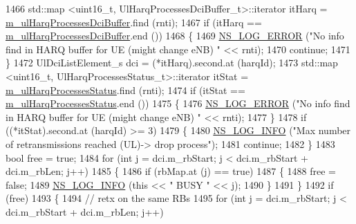 \begin{DoxyCode}
1466               std::map <uint16\_t, UlHarqProcessesDciBuffer\_t>::iterator itHarq = 
      \hyperlink{classns3_1_1TtaFfMacScheduler_a9ead4d91174d42d6995978358c08689e}{m\_ulHarqProcessesDciBuffer}.find (rnti);
1467               \textcolor{keywordflow}{if} (itHarq == \hyperlink{classns3_1_1TtaFfMacScheduler_a9ead4d91174d42d6995978358c08689e}{m\_ulHarqProcessesDciBuffer}.end ())
1468                 \{
1469                   \hyperlink{group__logging_ga0261a8db1d4ac5f79417d117634fd455}{NS\_LOG\_ERROR} (\textcolor{stringliteral}{"No info find in HARQ buffer for UE (might change eNB) "} << 
      rnti);
1470                   \textcolor{keywordflow}{continue};
1471                 \}
1472               UlDciListElement\_s dci = (*itHarq).second.at (harqId);
1473               std::map <uint16\_t, UlHarqProcessesStatus\_t>::iterator itStat = 
      \hyperlink{classns3_1_1TtaFfMacScheduler_a2c0bc82abe6c71b7e4d85b4caca2aaa6}{m\_ulHarqProcessesStatus}.find (rnti);
1474               \textcolor{keywordflow}{if} (itStat == \hyperlink{classns3_1_1TtaFfMacScheduler_a2c0bc82abe6c71b7e4d85b4caca2aaa6}{m\_ulHarqProcessesStatus}.end ())
1475                 \{
1476                   \hyperlink{group__logging_ga0261a8db1d4ac5f79417d117634fd455}{NS\_LOG\_ERROR} (\textcolor{stringliteral}{"No info find in HARQ buffer for UE (might change eNB) "} << 
      rnti);
1477                 \}
1478               \textcolor{keywordflow}{if} ((*itStat).second.at (harqId) >= 3)
1479                 \{
1480                   \hyperlink{group__logging_gafbd73ee2cf9f26b319f49086d8e860fb}{NS\_LOG\_INFO} (\textcolor{stringliteral}{"Max number of retransmissions reached (UL)-> drop process"});
1481                   \textcolor{keywordflow}{continue};
1482                 \}
1483               \textcolor{keywordtype}{bool} free = \textcolor{keyword}{true};
1484               \textcolor{keywordflow}{for} (\textcolor{keywordtype}{int} j = dci.m\_rbStart; j < dci.m\_rbStart + dci.m\_rbLen; j++)
1485                 \{
1486                   \textcolor{keywordflow}{if} (rbMap.at (j) == \textcolor{keyword}{true})
1487                     \{
1488                       free = \textcolor{keyword}{false};
1489                       \hyperlink{group__logging_gafbd73ee2cf9f26b319f49086d8e860fb}{NS\_LOG\_INFO} (\textcolor{keyword}{this} << \textcolor{stringliteral}{" BUSY "} << j);
1490                     \}
1491                 \}
1492               \textcolor{keywordflow}{if} (free)
1493                 \{
1494                   \textcolor{comment}{// retx on the same RBs}
1495                   \textcolor{keywordflow}{for} (\textcolor{keywordtype}{int} j = dci.m\_rbStart; j < dci.m\_rbStart + dci.m\_rbLen; j++)

\end{DoxyCode}
